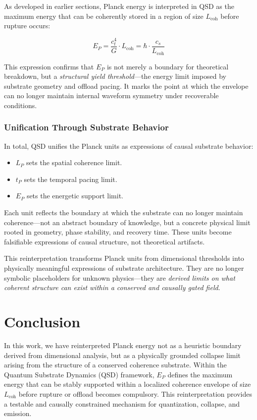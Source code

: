 \documentclass[entropy,article,submit,pdftex,moreauthors]{Definitions/mdpi}
\begin{document}
As developed in earlier sections, Planck energy is interpreted in QSD as the maximum energy that can be coherently stored in a region of size $L_{\text{coh}}$ before rupture occurs:

\begin{equation}
E_P = \frac{c_t^4}{G} \cdot L_{\text{coh}} = \hbar \cdot \frac{c_s}{L_{\text{coh}}}
\end{equation}

This expression confirms that $E_P$ is not merely a boundary for theoretical breakdown, but a \textit{structural yield threshold}---the energy limit imposed by substrate geometry and offload pacing. It marks the point at which the envelope can no longer maintain internal waveform symmetry under recoverable conditions.

\subsubsection{Unification Through Substrate Behavior}

In total, QSD unifies the Planck units as expressions of causal substrate behavior:
\begin{itemize}
  \item $L_P$ sets the spatial coherence limit.
  \item $t_P$ sets the temporal pacing limit.
  \item $E_P$ sets the energetic support limit.
\end{itemize}

Each unit reflects the boundary at which the substrate can no longer maintain coherence---not an abstract boundary of knowledge, but a concrete physical limit rooted in geometry, phase stability, and recovery time. These units become falsifiable expressions of causal structure, not theoretical artifacts.

This reinterpretation transforms Planck units from dimensional thresholds into physically meaningful expressions of substrate architecture. They are no longer symbolic placeholders for unknown physics—they are \textit{derived limits on what coherent structure can exist within a conserved and causally gated field}.


\section{Conclusion}

In this work, we have reinterpreted Planck energy not as a heuristic boundary derived from dimensional analysis, but as a physically grounded collapse limit arising from the structure of a conserved coherence substrate. Within the Quantum Substrate Dynamics (QSD) framework, $E_P$ defines the maximum energy that can be stably supported within a localized coherence envelope of size $L_{\text{coh}}$ before rupture or offload becomes compulsory. This reinterpretation provides a testable and causally constrained mechanism for quantization, collapse, and emission.
\end{document}
